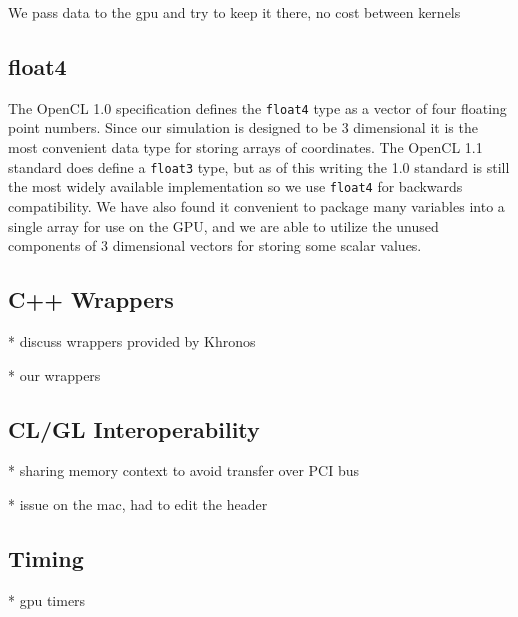 We pass data to the gpu and try to keep it there, no cost between kernels


\subsection{float4}
The OpenCL 1.0 specification defines the \verb|float4| type as a vector of four
floating point numbers. Since our simulation is designed to be 3 dimensional it
is the most convenient data type for storing arrays of coordinates. The OpenCL
1.1 standard does define a \verb|float3| type, but as of this writing the 1.0
standard is still the most widely available implementation so we use \verb|float4|
for backwards compatibility. We have also found it convenient to package many
variables into a single array for use on the GPU, and we are able to utilize
the unused components of 3 dimensional vectors for storing some scalar values.

\subsection{C++ Wrappers}
* discuss wrappers provided by Khronos


* our wrappers


\subsection{CL/GL Interoperability}
* sharing memory context to avoid transfer over PCI bus


* issue on the mac, had to edit the header

\subsection{Timing}
* gpu timers


